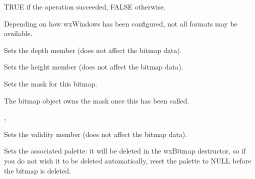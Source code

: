 
TRUE if the operation succeeded, FALSE otherwise.


Depending on how wxWindows has been configured, not all formats may be available.



\label{wxbitmapsetdepth}


Sets the depth member (does not affect the bitmap data).



\label{wxbitmapsetheight}


Sets the height member (does not affect the bitmap data).



\label{wxbitmapsetmask}


Sets the mask for this bitmap.


The bitmap object owns the mask once this has been called.


, 



Sets the validity member (does not affect the bitmap data).



\label{wxbitmapsetpalette}


Sets the associated palette: it will be deleted in the wxBitmap
destructor, so if you do not wish it to be deleted automatically,
reset the palette to NULL before the bitmap is deleted.

